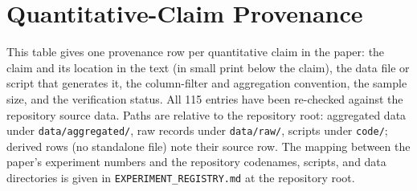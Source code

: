 \FloatBarrier
\section{Quantitative-Claim Provenance}\label{app:provenance}

This table gives one provenance row per quantitative claim in the paper: the claim and its location in the text (in small print below the claim), the data file or script that generates it, the column-filter and aggregation convention, the sample size, and the verification status. All 115 entries have been re-checked against the repository source data. Paths are relative to the repository root: aggregated data under \texttt{data/aggregated/}, raw records under \texttt{data/raw/}, scripts under \texttt{code/}; derived rows (no standalone file) note their source row. The mapping between the paper's experiment numbers and the repository codenames, scripts, and data directories is given in \texttt{EXPERIMENT\_REGISTRY.md} at the repository root.

